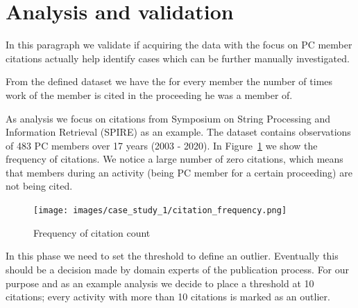 \documentclass{ou-report}
\newcommand{\outline}[1]{{\color{blue} #1}}
\begin{document}


\section{Analysis and validation}
\label{sec:cs1_analysis}

In this paragraph we validate if acquiring the data with the focus on PC member
citations actually help identify cases which can be further manually 
investigated.

From the defined dataset we have the for every member the number of times work of 
the member is cited in the proceeding he was a member of.

As analysis we focus on citations from Symposium 
on String Processing and Information Retrieval (SPIRE) as an example. The dataset 
contains observations of 483 PC members over 17 years (2003 - 2020).
In Figure~\ref{fig:citation_frequency} we show the frequency of citations. We notice
a large number of zero citations, which means that members during an activity 
(being PC member for a certain proceeding) are not being cited.

\begin{figure}[H]
    \centering
    \texttt{[image: images/case\_study\_1/citation\_frequency.png]}
    \caption{Frequency of citation count}
    \label{fig:citation_frequency}
\end{figure}

In this phase we need to set the threshold to define an outlier. Eventually
this should be a decision made by domain experts of the publication process.
For our purpose and as an example
analysis we decide to place a threshold at 10 citations; every activity with
more than 10 citations is marked as an outlier.




\end{document}
